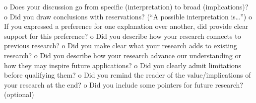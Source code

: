 o Does your discussion go from specific (interpretation) to broad (implications)?
o Did you draw conclusions with reservations? (“A possible interpretation is…”)
o If you expressed a preference for one explanation over another, did provide clear
support for this preference?
o Did you describe how your research connects to previous research?
o Did you make clear what your research adds to existing research?
o Did you describe how your research advance our understanding or how they may inspire
future applications?
o Did you clearly admit limitations before qualifying them?
o Did you remind the reader of the value/implications of your research at the end?
o Did you include some pointers for future research? (optional)
